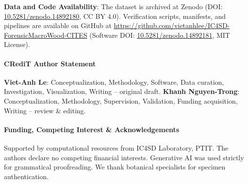 \documentclass[a4paper,fleqn,12pt]{cas-sc}
\begin{document}
\noindent
\textbf{Data and Code Availability}: The dataset is archived at Zenodo (DOI: \href{https://doi.org/10.5281/zenodo.14892180}{10.5281/zenodo.14892180}, CC BY 4.0). Verification scripts, manifests, and pipelines are available on GitHub at \url{https://github.com/vietanhlee/IC4SD-ForensicMacroWood-CITES} (Software DOI: \href{https://doi.org/10.5281/zenodo.14892181}{10.5281/zenodo.14892181}, MIT License).

\paragraph{CRediT Author Statement}
\textbf{Viet-Anh Le}: Conceptualization, Methodology, Software, Data curation, Investigation, Visualization, Writing -- original draft. \textbf{Khanh Nguyen-Trong}: Conceptualization, Methodology, Supervision, Validation, Funding acquisition, Writing -- review \& editing.

\paragraph{Funding, Competing Interest \& Acknowledgements}
Supported by computational resources from IC4SD Laboratory, PTIT. The authors declare no competing financial interests. Generative AI was used strictly for grammatical proofreading. We thank botanical specialists for specimen authentication.

\begingroup
\fontsize{7.5pt}{8.6pt}\selectfont
\setlength{\bibsep}{0.0pt}


\endgroup
\end{document}
